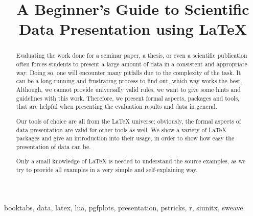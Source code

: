 \documentclass[conference,a4paper,english]{IEEEtran}
\begin{document}
\title{A Beginner's Guide to Scientific Data Presentation using \LaTeX}

\author{
  }

\maketitle

\begin{abstract}
  Evaluating the work done for a seminar paper, a thesis, or even a scientific
  publication often forces students to present a large amount of data in a
  consistent and appropriate way.  Doing so, one will encounter many pitfalls
  due to the complexity of the task.  It can be a long-running and frustrating
  process to find out, which way works the best.  Although, we cannot provide
  universally valid rules, we want to give some hints and guidelines with this
  work.  Therefore, we present formal aspects, packages and tools, that are
  helpful when presenting the evaluation results and data in general.

  Our tools of choice are all from the \LaTeX{} universe; obviously, the formal
  aspects of data presentation are valid for other tools as well.  We show a
  variety of \LaTeX{} packages and give an introduction into their usage, in
  order to show how easy the presentation of data can be.

  Only a small knowledge of \LaTeX{} is needed to understand the source
  examples, as we try to provide all examples in a very simple and
  self-explaining way.
\end{abstract}
\begin{IEEEkeywords}
  booktabs, data, latex, lua, pgfplots, presentation, pstricks, r, siunitx,
  sweave
\end{IEEEkeywords}












\end{document}
